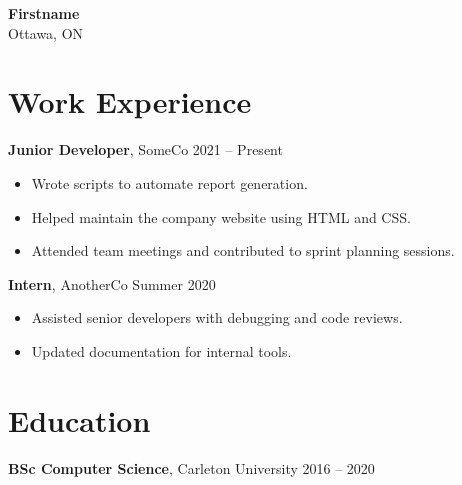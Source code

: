 \documentclass[10pt, letterpaper]{article}
\begin{document}
\begin{center}
    {\Large \textbf{Firstname}}\\[4pt]
    Ottawa, ON
\end{center}


\section*{Work Experience}
\textbf{Junior Developer}, SomeCo \hfill 2021 -- Present
\begin{itemize}[leftmargin=*]
    \item Wrote scripts to automate report generation.
    \item Helped maintain the company website using HTML and CSS.
    \item Attended team meetings and contributed to sprint planning sessions.
\end{itemize}

\textbf{Intern}, AnotherCo \hfill Summer 2020
\begin{itemize}[leftmargin=*]
    \item Assisted senior developers with debugging and code reviews.
    \item Updated documentation for internal tools.
\end{itemize}

\section*{Education}
\textbf{BSc Computer Science}, Carleton University \hfill 2016 -- 2020

\end{document}
